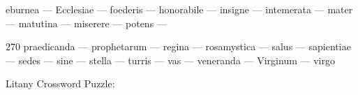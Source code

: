 \documentclass[12pt]{article}
\begin{document}
\pagestyle{fancy}
\fancyhf{}
\renewcommand{\headrulewidth}{0pt}
\renewcommand{\footrulewidth}{0pt}
\libertine
\renewcommand\PuzzleClueFont{\rm\normalsize}
\noindent\begin{rotate}{0}
\small eburnea --- Ecclesiae --- foederis --- honorabile --- insigne --- intemerata --- mater --- matutina --- miserere --- potens ---
\end{rotate}
\hfill
\begin{rotate}{270}
\small praedicanda --- prophetarum --- regina --- rosamystica --- salus --- sapientiae --- sedes --- sine --- stella --- turris --- vas --- veneranda --- Virginum --- virgo
\end{rotate}
\begin{center}
  \huge{Litany Crossword Puzzle:}
\end{center}
\vspace{1.5cm}
\end{document}
